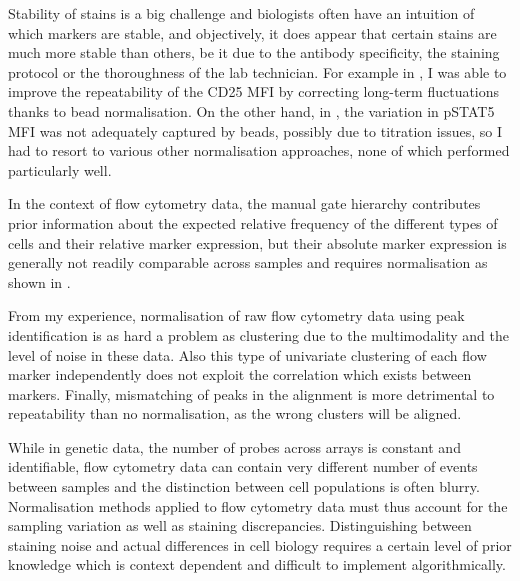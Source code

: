 Stability of stains is a big challenge and biologists often have an intuition of which markers are stable, and objectively, it does appear that certain stains are much more stable than others, be it due to the antibody specificity, the staining protocol or the thoroughness of the lab technician.
For example in , I was able to improve the repeatability of the CD25 MFI by correcting long-term fluctuations thanks to bead normalisation.
On the other hand, in , the variation in pSTAT5 MFI was not adequately captured by beads, possibly due to titration issues, so I had to resort to various other normalisation approaches, none of which performed particularly well.

In the context of flow cytometry data, the manual gate hierarchy contributes prior information about the expected relative frequency of the different types of cells and their relative marker expression, but their absolute marker expression is generally not readily comparable across samples and requires normalisation as shown in .

From my experience, normalisation of raw flow cytometry data using peak identification is as hard a problem as clustering due to the multimodality and the level of noise in these data.
Also this type of univariate clustering of each flow marker independently does not exploit the correlation which exists between markers.
Finally, mismatching of peaks in the alignment is more detrimental to repeatability than no normalisation, as the wrong clusters will be aligned.

While in genetic data, the number of probes across arrays is constant and identifiable, flow cytometry data can contain very different number of events between samples and the distinction between cell populations is often blurry.
Normalisation methods applied to flow cytometry data must thus account for the sampling variation as well as staining discrepancies.
Distinguishing between staining noise and actual differences in cell biology requires a certain level of prior knowledge which is context dependent and difficult to implement algorithmically.

